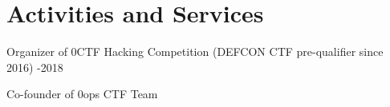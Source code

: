 \section*{Activities and Services}
\begin{description}
\item Organizer of 0CTF Hacking Competition (DEFCON CTF pre-qualifier since 2016) -2018
\item Co-founder of 0ops CTF Team 
\end{description}
